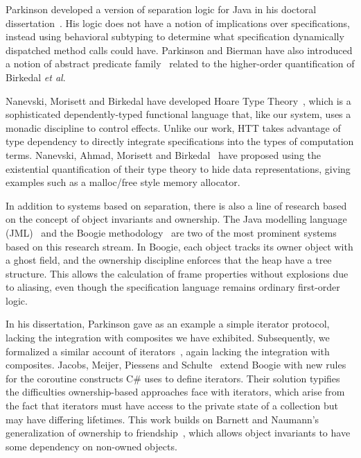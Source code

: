 \documentclass[preprint,natbib]{sigplanconf}
\begin{document}
Parkinson developed a version of separation logic for Java in his
doctoral dissertation~\cite{parkinson-thesis}. His logic does not have
a notion of implications over specifications, instead using behavioral
subtyping to determine what specification dynamically dispatched
method calls could have. Parkinson and Bierman have also introduced a
notion of abstract predicate family~\cite{parkinson-bierman-05}
related to the higher-order quantification of Birkedal \emph{et al}.

Nanevski, Morisett and Birkedal have developed Hoare Type
Theory~\cite{htt}, which is a sophisticated dependently-typed
functional language that, like our system, uses a monadic discipline
to control effects.  Unlike our work, HTT takes advantage of type
dependency to directly integrate specifications into the types of
computation terms. Nanevski, Ahmad, Morisett and
Birkedal~\cite{abstract-htt} have proposed using the existential
quantification of their type theory to hide data representations,
giving examples such as a malloc/free style memory allocator.

In addition to systems based on separation, there is also a line of
research based on the concept of object invariants and ownership.  The
Java modelling language (JML)~\cite{jml} and the Boogie
methodology~\cite{boogie} are two of the most prominent systems based
on this research stream. In Boogie, each object tracks its owner
object with a ghost field, and the ownership discipline enforces that
the heap have a tree structure. This allows the calculation of frame
properties without explosions due to aliasing, even though the
specification language remains ordinary first-order logic.

In his dissertation, Parkinson gave as an example a simple iterator
protocol, lacking the integration with composites we have exhibited.
Subsequently, we formalized a similar account of
iterators~\cite{iterator}, again lacking the integration with
composites. Jacobs, Meijer, Piessens and
Schulte~\cite{iterators-revisited} extend Boogie with new rules for
the coroutine constructs C\# uses to define iterators. Their solution
typifies the difficulties ownership-based approaches face with
iterators, which arise from the fact that iterators must have access
to the private state of a collection but may have differing
lifetimes. This work builds on Barnett and Naumann's generalization of
ownership to friendship~\cite{friends}, which allows object invariants
to have some dependency on non-owned objects.
\end{document}
